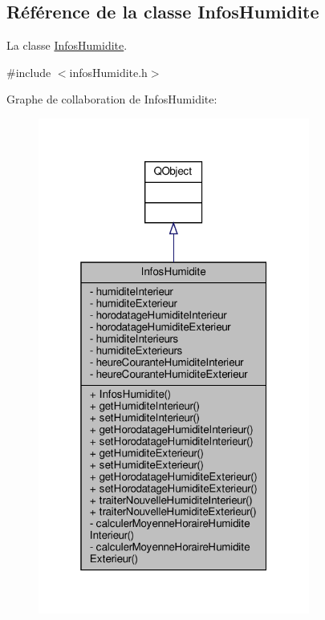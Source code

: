 \hypertarget{class_infos_humidite}{}\subsection{Référence de la classe Infos\+Humidite}
\label{class_infos_humidite}


La classe \hyperlink{class_infos_humidite}{Infos\+Humidite}.  




{\ttfamily \#include $<$infos\+Humidite.\+h$>$}



Graphe de collaboration de Infos\+Humidite\+:\nopagebreak
\begin{figure}[H]
\begin{center}
\leavevmode
\includegraphics[width=253pt]{class_infos_humidite__coll__graph}
\end{center}
\end{figure}
